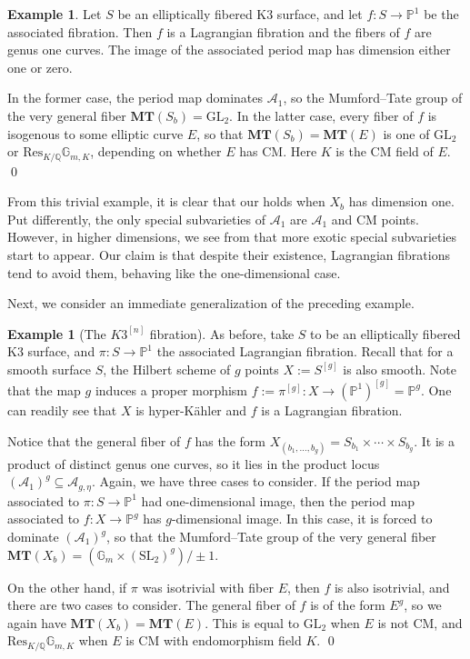 \documentclass[12pt]{amsart}
\newcommand{\Q}{\mathbb{Q}}
\newcommand{\bbP}{\mathbb{P}}
\newcommand{\cA}{\mathcal{A}}
\newcommand{\SL}{\mathrm{SL}}
\newcommand{\GL}{\mathrm{GL}}
\theoremstyle{definition}
\newtheorem{example}[theorem]{Example}
\numberwithin{equation}{section}
\begin{document}
\begin{example}
Let \(S\) be an elliptically fibered K3 surface, and let \(f: S \to \bbP^1\) be the 
associated fibration. Then \(f\) is a Lagrangian fibration and the fibers of \(f\) 
are genus one curves. The image of the associated period map has dimension either 
one or zero.

In the former case, the period map dominates \(\cA_1\), so the Mumford--Tate group 
of the very general fiber \(\mathbf{MT}(S_b) = \GL_2\). In the latter case, 
every fiber of \(f\) is isogenous to some elliptic curve \(E\), so that 
\(\mathbf{MT}(S_b) = \mathbf{MT}(E)\) is one of \(\GL_2\) or 
\(\mathrm{Res}_{K/\Q} \mathbb{G}_{m, K}\), depending on whether \(E\) has CM. 
Here \(K\) is the CM field of \(E\). \qed
\end{example}

From this trivial example, it is clear that our  holds when 
\(X_b\) has dimension one. Put differently, the only special subvarieties of \(\cA_1\) 
are \(\cA_1\) and CM points. However, in higher dimensions, we see from 
 that more exotic special subvarieties start to appear. 
Our claim is that despite their existence, Lagrangian fibrations tend to avoid them, 
behaving like the one-dimensional case. 

Next, we consider an immediate generalization of the preceding example.

\begin{example}[The \(K3^{[n]}\) fibration] \label{example-K3n}
As before, take \(S\) to be an elliptically fibered K3 surface, and \(\pi: S \to \bbP^1\) 
the associated Lagrangian fibration. Recall that for a smooth surface \(S\), 
the Hilbert scheme of \(g\) points \(X := S^{[g]}\) is also smooth. Note that 
the map \(g\) induces a proper morphism \(f := \pi^{[g]}: X \to (\bbP^1)^{[g]} = \bbP^g\).
One can readily see that \(X\) is hyper-K\"ahler and \(f\) is a Lagrangian fibration.

Notice that the general fiber of \(f\) has the form 
\(X_{(b_1, \dots, b_g)} = S_{b_1} \times \cdots \times S_{b_g}\). It is a product of 
distinct genus one curves, so it lies in the product locus 
\((\cA_1)^g \subseteq \cA_{g, \eta}\). Again, we have three cases to consider. 
If the period map associated to \(\pi: S \to \bbP^1\) had one-dimensional image, 
then the period map associated to \(f: X \to \bbP^g\) has \(g\)-dimensional image. 
In this case, it is forced to dominate \((\cA_1)^g\), so that the Mumford--Tate group of 
the very general fiber \(\mathbf{MT}(X_b) = (\mathbb{G}_m \times (\SL_2)^g) / \pm 1\).

On the other hand, if \(\pi\) was isotrivial with fiber \(E\), then \(f\) is also 
isotrivial, and there are two cases to consider. The general fiber of \(f\) is of the 
form \(E^g\), so we again have \(\mathbf{MT}(X_b) = \mathbf{MT}(E)\). 
This is equal to \(\GL_2\) when \(E\) is not CM, and 
\(\mathrm{Res}_{K/\Q} \mathbb{G}_{m, K}\) when \(E\) is CM with endomorphism field \(K\). 
\qed
\end{example}
\end{document}
